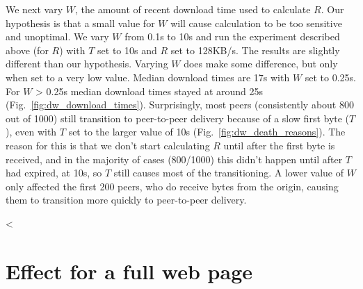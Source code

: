 We next vary $W$, the amount of recent download time used to calculate $R$. Our hypothesis is that 
a small value for $W$ will cause calculation to be too sensitive and unoptimal. We vary $W$ from 0.1s 
to 10s and run the experiment described above (for $R$) with $T$ set to 10s and $R$ set to 128KB/s. The results are 
slightly different than our hypothesis. Varying $W$ does make some difference, but only when set 
to a very low value. Median download times are 17s with $W$ set to 0.25s. For $W$ \textgreater{} 0.25s 
median download times stayed at around 25s (Fig.~\ref{fig:dw_download_times}). Surprisingly, 
most peers (consistently about 800 out of 1000) still transition to peer-to-peer delivery because of 
a slow first byte ($T$), even with $T$ set to the larger value of 10s (Fig.~\ref{fig:dw_death_reasons}). 
The reason for this is that we don't start calculating $R$ until after the first byte is received, and 
in the majority of cases (800/1000) this didn't happen until after $T$ had expired, at 10s, so $T$ still 
causes most of the transitioning. A lower value of $W$ only affected the first 
200 peers, who do receive bytes from the origin, causing them to transition more quickly to peer-to-peer delivery.



<%

\section{Effect for a full web page}

